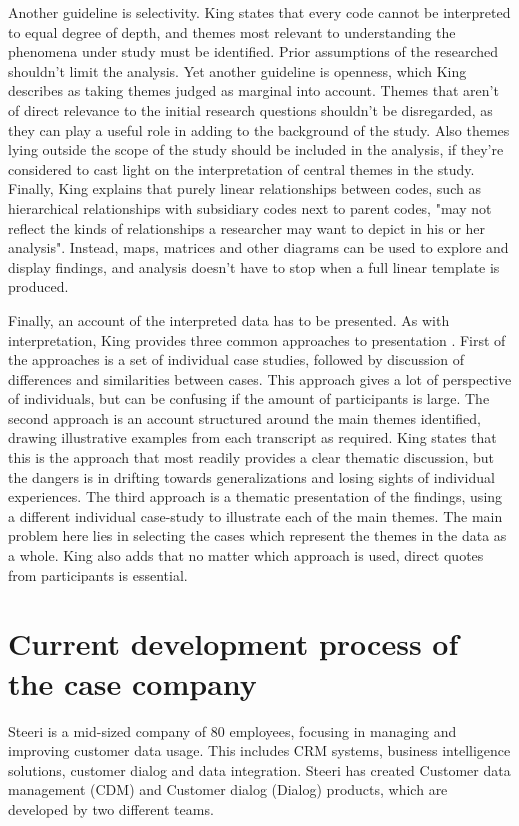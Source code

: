 \documentclass[english]{tktltiki2}
\theoremstyle{definition}
\theoremstyle{remark}
\begin{document}
Another guideline is selectivity. King states that every code cannot be interpreted to equal degree of depth, and themes most relevant to understanding the phenomena under study must be identified. Prior assumptions of the researched shouldn't limit the analysis. Yet another guideline is openness, which King describes as taking themes judged as marginal into account. Themes that aren't of direct relevance to the initial research questions shouldn't be disregarded, as they can play a useful role in adding to the background of the study. Also themes lying outside the scope of the study should be included in the analysis, if they're considered to cast light on the interpretation of central themes in the study. Finally, King explains that purely linear relationships between codes, such as hierarchical relationships with subsidiary codes next to parent codes, "may not reflect the kinds of relationships a researcher may want to depict in his or her analysis". Instead, maps, matrices and other diagrams can be used to explore and display findings, and analysis doesn't have to stop when a full linear template is produced.

Finally, an account of the interpreted data has to be presented. As with interpretation, King provides three common approaches to presentation \cite{king2004using}. First of the approaches is a set of individual case studies, followed by discussion of differences and similarities between cases. This approach gives a lot of perspective of individuals, but can be confusing if the amount of participants is large. The second approach is an account structured around the main themes identified, drawing illustrative examples from each transcript as required. King states that this is the approach that most readily provides a clear thematic discussion, but the dangers is in drifting towards generalizations and losing sights of individual experiences. The third approach is a thematic presentation of the findings, using a different individual case-study to illustrate each of the main themes. The main problem here lies in selecting the cases which represent the themes in the data as a whole. King also adds that no matter which approach is used, direct quotes from participants is essential.  

\section{Current development process of the case company}	
Steeri is a mid-sized company of 80 employees, focusing in managing and improving customer data usage. This includes CRM systems, business intelligence solutions, customer dialog and data integration. Steeri has created Customer data management (CDM) and Customer dialog (Dialog) products, which are developed by two different teams. 
\end{document}
